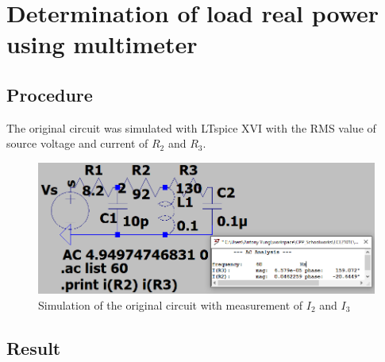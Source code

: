 \documentclass{article}
\begin{document}
\newpage

\section{Determination of load real power using multimeter}

\subsection*{Procedure}
The original circuit was simulated with LTspice XVI with the RMS value of source voltage and current of $R_2$ and $R_3$.

\begin{figure}[H]
    \centering
        \includegraphics[width=\textwidth]{ECE2101L_Lab09_B2.png}
        \caption{Simulation of the original circuit with measurement of $I_2$ and $I_3$}
\end{figure}

\subsection*{Result}
\begin{table}[H]
\end{table}
\end{document}

